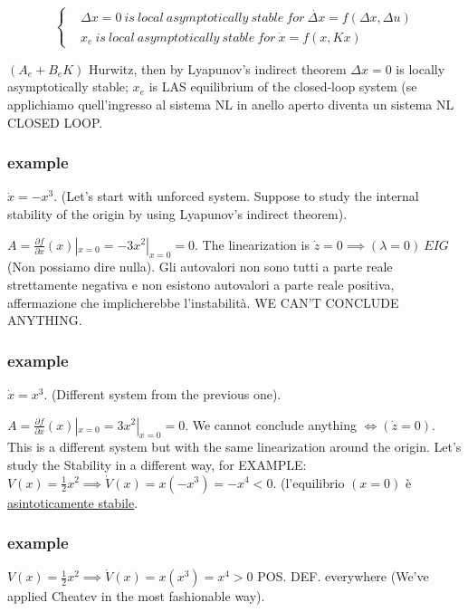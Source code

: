 \[
	\left\{
	\begin{aligned}
	&\Delta x = 0\ is\ local\ asymptotically\ stable\ for\ \dot{\Delta x}=f(\Delta x,\Delta u) \\
	&x_e\ is\ local\ asymptotically\ stable\ for\ \dot{x}=f(x,Kx)
	\end{aligned} 
	\right.
\]

$(A_e + B_eK)$ Hurwitz, then by Lyapunov's indirect theorem $\Delta x = 0$ is locally asymptotically stable; $x_e$ is LAS equilibrium of the closed-loop system (se applichiamo quell'ingresso al sistema NL in anello aperto diventa un sistema NL CLOSED LOOP.

\subsubsection{example}

$\dot{x}=-x^3$. (Let's start with unforced system. Suppose to study the internal stability of the origin by using Lyapunov's indirect theorem).

$A = \frac{\partial{f}}{\partial{x}}(x)|_{x=0} = -3x^2|_{x=0} = 0$. The linearization is $\dot{z}=0 \implies (\lambda = 0)\ EIG$ (Non possiamo dire nulla). Gli autovalori non sono tutti a parte reale strettamente negativa e non esistono autovalori a parte reale positiva, affermazione che implicherebbe l'instabilità. WE CAN'T CONCLUDE ANYTHING.

\subsubsection{example}

$\dot{x}=x^3$. (Different system from the previous one).

$A = \frac{\partial{f}}{\partial{x}}(x)|_{x=0} = 3x^2|_{x=0} = 0$. We cannot conclude anything $\iff (\dot{z}=0)$. This is a different system but with the same linearization around the origin. Let's study the Stability in a different way, for EXAMPLE: $V(x) = \frac{1}{2}x^2 \implies \dot{V}(x) = x(-x^3) = -x^4 < 0$. (l'equilibrio $(x=0)$ è \underline{asintoticamente stabile}.

\subsubsection{example}

$V(x) = \frac{1}{2}x^2 \implies \dot{V}(x) = x(x^3) = x^4 > 0$ POS. DEF. everywhere (We've applied Cheatev in the most fashionable way).

